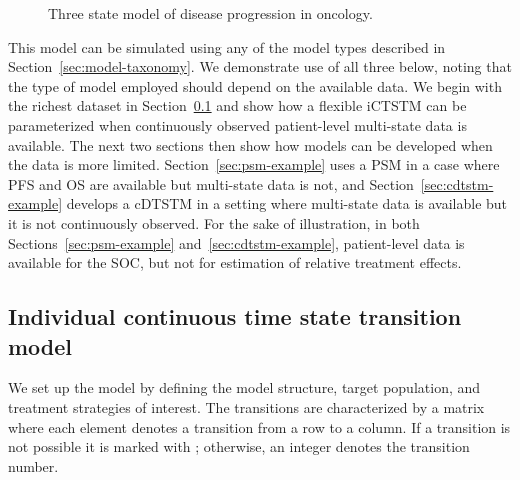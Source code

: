 \documentclass[article, nojss]{jss}\usepackage[]{graphicx}\usepackage[]{color}
\begin{document}
\begin{figure}[h]
\centering
{}
\caption{Three state model of disease progression in oncology.}\label{fig:three-state-model}
\end{figure}

This model can be simulated using any of the model types described in Section~\ref{sec:model-taxonomy}. We demonstrate use of all three below, noting that the type of model employed should depend on the available data. We begin with the richest dataset in Section~\ref{sec:ictstm-example} and show how a flexible iCTSTM can be parameterized when continuously observed patient-level multi-state data is available. The next two sections then show how models can be developed when the data is more limited. Section~\ref{sec:psm-example} uses a PSM in a case where PFS and OS are available but multi-state data is not, and Section~\ref{sec:cdtstm-example} develops a cDTSTM in a setting where multi-state data is available but it is not continuously observed. For the sake of illustration, in both Sections~\ref{sec:psm-example} and~\ref{sec:cdtstm-example}, patient-level data is available for the SOC, but not for estimation of relative treatment effects.

\subsection{Individual continuous time state transition model} \label{sec:ictstm-example}
We set up the model by defining the model structure, target population, and treatment strategies of interest. The transitions are characterized by a matrix where each element denotes a transition from a row to a column. If a transition is not possible it is marked with ; otherwise, an integer denotes the transition number.
\end{document}
